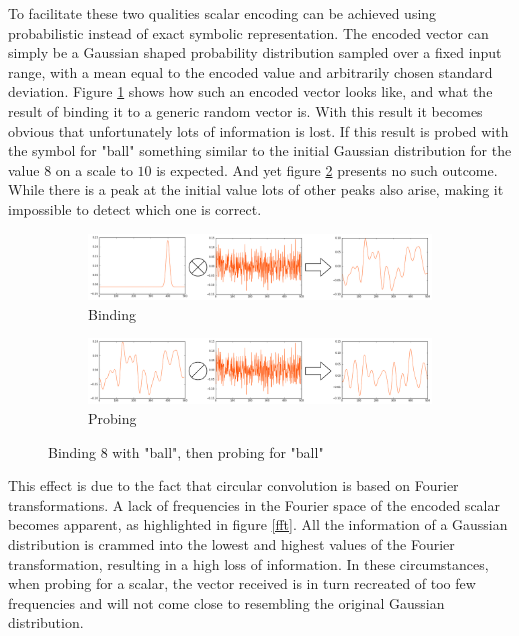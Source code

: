 \documentclass[a4paper,twoside]{article}
\begin{document}
	To facilitate these two qualities scalar encoding can be achieved using probabilistic instead of exact symbolic representation. 
The encoded vector can simply be a Gaussian shaped probability distribution sampled over a fixed input range, with a mean equal to the encoded value and arbitrarily chosen standard deviation.
Figure \ref{no-perm-a} shows how such an encoded vector looks like, and what the result of binding it to a generic random vector is.
With this result it becomes obvious that unfortunately lots of information is lost.
If this result is probed with the symbol for "ball" something similar to the initial Gaussian distribution for the value $8$ on a scale to $10$ is expected.
And yet figure \ref{no-perm-b} presents no such outcome.
While there is a peak at the initial value lots of other peaks also arise, making it impossible to detect which one is correct.

	
	\begin{figure}[th!]
		\begin{subfigure}{1\columnwidth}
			\includegraphics[width=\columnwidth]{img/scalar-pre-perm.png}
			\caption{Binding}
			\label{no-perm-a}
		\end{subfigure}
		\begin{subfigure}{1\columnwidth}
			\includegraphics[width=\columnwidth]{img/scalar-pre-perm-probe.png}
			\caption{Probing}
			\label{no-perm-b}
		\end{subfigure}
		\caption{Binding 8 with "ball", then probing for "ball"}
		\label{no-perm}
	\end{figure}
	
	This effect is due to the fact that circular convolution is based on Fourier transformations. A lack of frequencies in the Fourier space of the encoded scalar becomes apparent, as highlighted in figure \ref{fft}.
All the information of a Gaussian distribution is crammed into the lowest and highest values of the Fourier transformation, resulting in a high loss of information.
In these circumstances, when probing for a scalar, the vector received is in turn recreated of too few frequencies and will not come close to resembling the original Gaussian distribution.
\end{document}
